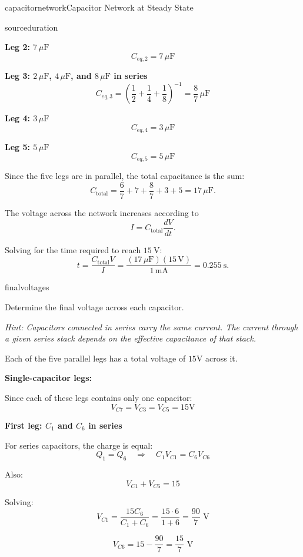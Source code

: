 \begin{mainquestion}{capacitornetwork}{Capacitor Network at Steady State}
\begin{partquestion}{sourceduration}
\begin{answer}[1.2in]
\textbf{Leg 2: $7\,\mu\text{F}$}
\[
C_{eq,2} = 7\,\mu\text{F}
\]

\textbf{Leg 3: $2\,\mu\text{F}$, $4\,\mu\text{F}$, and $8\,\mu\text{F}$ in series}
\[
C_{eq,3} =
\left(\frac{1}{2} + \frac{1}{4} + \frac{1}{8}\right)^{-1}
= \frac{8}{7}\,\mu\text{F}
\]

\textbf{Leg 4: $3\,\mu\text{F}$}
\[
C_{eq,4} = 3\,\mu\text{F}
\]

\textbf{Leg 5: $5\,\mu\text{F}$}
\[
C_{eq,5} = 5\,\mu\text{F}
\]

\medskip
Since the five legs are in parallel, the total capacitance is the sum:
\[
C_\text{total}
= \frac{6}{7} + 7 + \frac{8}{7} + 3 + 5
= \boxed{17\,\mu\text{F}}.
\]

The voltage across the network increases according to
\[
I = C_\text{total}\frac{dV}{dt}.
\]

Solving for the time required to reach $\SI{15}{\volt}$:
\[
t = \frac{C_\text{total} V}{I}
= \frac{(17\,\mu\text{F})(15\,\text{V})}{1\,\text{mA}}
= \boxed{\SI{0.255}{\second}}.
\]
\end{answer}

\end{partquestion}

\begin{partquestion}{finalvoltages}
{Determine the final voltage across each capacitor.

\emph{Hint: Capacitors connected in series carry the same current.
The current through a given series stack depends on the effective
capacitance of that stack.}}

\begin{answer}
Each of the five parallel legs has a total voltage of $15\text{V}$ across it.

\medskip
\textbf{Single-capacitor legs:}

Since each of these legs contains only one capacitor:
\[
V_{C7} = V_{C3} = V_{C5} = 15\text{V}
\]

\medskip
\textbf{First leg: $C_1$ and $C_6$ in series}

For series capacitors, the charge is equal:
\[
Q_1 = Q_6 \quad \Rightarrow \quad C_1 V_{C1} = C_6 V_{C6}
\]

Also:
\[
V_{C1} + V_{C6} = 15
\]

Solving:
\[
V_{C1} = \frac{15 C_6}{C_1 + C_6}
       = \frac{15 \cdot 6}{1 + 6}
       = \boxed{\frac{90}{7}\text{ V}}
\]

\[
V_{C6} = 15 - \frac{90}{7}
       = \boxed{\frac{15}{7}\text{ V}}
\]


\end{answer}
\end{partquestion}
\end{mainquestion}
